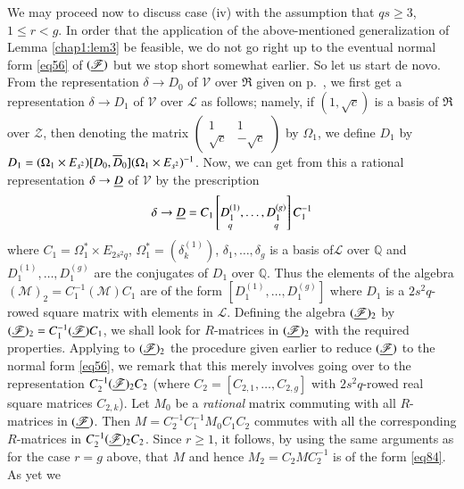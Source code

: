 We may proceed now to discuss case (iv) with the assumption that
$qs\geq 3$, $1\leq r<g$. In order that the application of the
above-mentioned generalization of Lemma \ref{chap1:lem3} be feasible, we do
not go right up to the eventual normal form \eqref{eq56} of
$(\underline{\mathscr{F}})$ but we stop short somewhat earlier. So let us
start de novo. From the representation $\delta\to D_{0}$ of
$\mathscr{V}$ over $\mathfrak{R}$ given on p.~\pageref{eq51}, we first get a
representation $\delta\to D_{1}$ of $\mathscr{V}$ over $\mathscr{L}$
as follows; namely, if $(1,\sqrt{c})$ is a basis of $\mathfrak{R}$
over $\mathscr{Z}$, then denoting the matrix
$\left(\begin{smallmatrix} 1 & 1\\ \sqrt{c} & -\sqrt{c}
\end{smallmatrix}\right)$ by $\Omega_{1}$, we define $D_{1}$ by
$D_{1}=(\Omega_{1}\times E_{s^2})[D_{0},\overline{D}_{0}](\Omega_{1}\times
E_{s^2})^{-1}$. Now, we can get from this a rational representation
$\delta\to \underline{D}$ of $\mathscr{V}$ by the prescription
$$
\delta\to
\underline{D}=C_{1}\left[\underset{q}{D^{(1)}_{1}},\ldots,
\underset{q}{D^{(g)}_{1}}\right]C^{-1}_{1}
$$
where $C_{1}=\Omega^{\ast}_{1}\times E_{2s^2q}$,
$\Omega^{\ast}_{1}=(\delta^{(1)}_{k})$, $\delta_{1},\ldots,\delta_{g}$
is a basis of\pageoriginale $\mathscr{L}$ over $\mathbb{Q}$ and
$D^{(1)}_{1},\ldots,D^{(g)}_{1}$ are the conjugates of $D_{1}$ over
$\mathbb{Q}$. Thus the elements of the algebra
$(\mathscr{M})_{2}=C^{-1}_{1}(\mathscr{M})C_{1}$ are of the form
$[D^{(1)}_{1},\ldots,D^{(g)}_{1}]$ where $D_{1}$ is a $2s^{2}q$-rowed
square matrix with elements in $\mathscr{L}$. Defining the algebra
$(\underline{\mathscr{F}})_{2}$ by
$(\underline{\mathscr{F}})_{2}=C^{-1}_{1}(\underline{\mathscr{F}})C_{1}$, we shall
look for $R$-matrices in $(\underline{\mathscr{F}})_{2}$ with the required
properties. Applying to $(\underline{\mathscr{F}})_{2}$ the procedure given
earlier to reduce $(\underline{\mathscr{F}})$ to the normal form \eqref{eq56},
we remark that this merely involves going over to the representation
$C^{-1}_{2}(\underline{\mathscr{F}})_{2}C_{2}$ (where
$C_{2}=[C_{2,1},\ldots,C_{2,g}]$ with $2s^{2}q$-rowed real square
matrices $C_{2,k}$). Let $M_{0}$ be a {\em rational} matrix commuting
with all $R$-matrices in $(\underline{\mathscr{F}})$. Then
$M=C^{-1}_{2}C^{-1}_{1}M_{0}C_{1}C_{2}$ commutes with all the
corresponding $R$-matrices in
$C^{-1}_{2}(\underline{\mathscr{F}})_{2}C_{2}$. Since $r\geq 1$, it follows,
by using the same arguments as for the case $r=g$ above, that $M$ and
hence $M_{2}=C_{2}MC^{-1}_{2}$ is of the form \eqref{eq84}. As yet we
